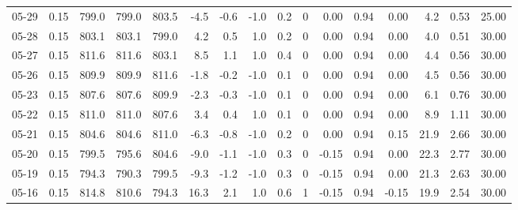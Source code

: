 \begin{threeparttable}
{\begin{tabular}{lrrrrrrrrrrrrrrr}
  05-29 &     0.15 & 799.0 & 799.0 & 803.5 &       -4.5 &           -0.6 &                     -1.0 &                 0.2 &              0 &       0.00 &      0.94 &           0.00 &              4.2 &            0.53 &                  25.00 \\
  05-28 &     0.15 & 803.1 & 803.1 & 799.0 &        4.2 &            0.5 &                      1.0 &                 0.2 &              0 &       0.00 &      0.94 &           0.00 &              4.0 &            0.51 &                  30.00 \\
  05-27 &     0.15 & 811.6 & 811.6 & 803.1 &        8.5 &            1.1 &                      1.0 &                 0.4 &              0 &       0.00 &      0.94 &           0.00 &              4.4 &            0.56 &                  30.00 \\
  05-26 &     0.15 & 809.9 & 809.9 & 811.6 &       -1.8 &           -0.2 &                     -1.0 &                 0.1 &              0 &       0.00 &      0.94 &           0.00 &              4.5 &            0.56 &                  30.00 \\
  05-23 &     0.15 & 807.6 & 807.6 & 809.9 &       -2.3 &           -0.3 &                     -1.0 &                 0.1 &              0 &       0.00 &      0.94 &           0.00 &              6.1 &            0.76 &                  30.00 \\
  05-22 &     0.15 & 811.0 & 811.0 & 807.6 &        3.4 &            0.4 &                      1.0 &                 0.1 &              0 &       0.00 &      0.94 &           0.00 &              8.9 &            1.11 &                  30.00 \\
  05-21 &     0.15 & 804.6 & 804.6 & 811.0 &       -6.3 &           -0.8 &                     -1.0 &                 0.2 &              0 &       0.00 &      0.94 &           0.15 &             21.9 &            2.66 &                  30.00 \\
  05-20 &     0.15 & 799.5 & 795.6 & 804.6 &       -9.0 &           -1.1 &                     -1.0 &                 0.3 &              0 &      -0.15 &      0.94 &           0.00 &             22.3 &            2.77 &                  30.00 \\
  05-19 &     0.15 & 794.3 & 790.3 & 799.5 &       -9.3 &           -1.2 &                     -1.0 &                 0.3 &              0 &      -0.15 &      0.94 &           0.00 &             21.3 &            2.63 &                  30.00 \\
  05-16 &     0.15 & 814.8 & 810.6 & 794.3 &       16.3 &            2.1 &                      1.0 &                 0.6 &              1 &      -0.15 &      0.94 &          -0.15 &             19.9 &            2.54 &                  30.00 \\

\end{tabular}}
\end{threeparttable}
